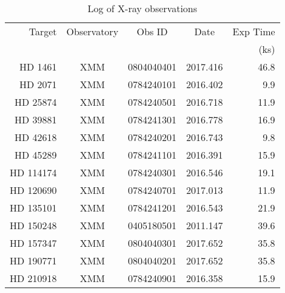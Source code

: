 
\begin{table}
\caption{Log of X-ray observations\label{tab:obs}}

  \centering
  \begin{tabular}{rcccr}
    \hline
    \hline
    Target & Observatory & Obs ID & Date & Exp Time \\
           &              &       &      & (ks) \\ 
    \hline       
HD 1461 & XMM & 0804040401 & 2017.416 &  46.8 \\ 
HD 2071 & XMM & 0784240101 & 2016.402 &   9.9 \\ 
HD 25874 & XMM & 0784240501 & 2016.718 &  11.9 \\ 
HD 39881 & XMM & 0784241301 & 2016.778 &  16.9 \\ 
HD 42618 & XMM & 0784240201 & 2016.743 &   9.8 \\ 
HD 45289 & XMM & 0784241101 & 2016.391 &  15.9 \\ 
HD 114174 & XMM & 0784240301 & 2016.546 &  19.1 \\ 
HD 120690 & XMM & 0784240701 & 2017.013 &  11.9 \\ 
HD 135101 & XMM & 0784241201 & 2016.543 &  21.9 \\ 
HD 150248 & XMM & 0405180501 & 2011.147 &  39.6 \\ 
HD 157347 & XMM & 0804040301 & 2017.652 &  35.8 \\ 
HD 190771 & XMM & 0804040201 & 2017.652 &  35.8 \\ 
HD 210918 & XMM & 0784240901 & 2016.358 &  15.9 \\ 

    \hline
  \end{tabular}
\end{table}
